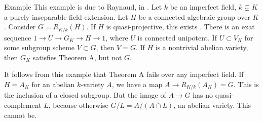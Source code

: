 \begin{enonce}[remark]{Example}
This example is due to Raynaud, in \cite[XVIII.A3]{sga3}. Let $k$ be an 
imperfect field, $k\subsetneq K$ a purely inseparable field extension. Let 
$H$ be a connected algebraic group over $K$. Consider 
$G=R_{K/k}(H)$. If $H$ is quasi-projective, this exists \cite[A]{cgp10}. There 
is an exat sequence $1 \to U \to G_K\to H \to 1$, where $U$ is connected 
unipotent. If $U\subset V_K$ for some subgroup scheme $V\subset G$, then $V=G$. 
If $H$ is a nontrivial abelian variety, then $G_K$ satisfies Theorem A, but 
not $G$. 
\end{enonce}

It follows from this example that Theorem A fails over any 
imperfect field. If $H=A_K$ for an abelian $k$-variety $A$, we have a map 
$A\to R_{K/k}(A_K)=G$. This is the inclusion of a closed subgroup. But the 
image of $A\to G$ has no quasi-complement $L$, because otherwise 
$G/L=A/(A\cap L)$, an abelian variety. This cannot be. 

